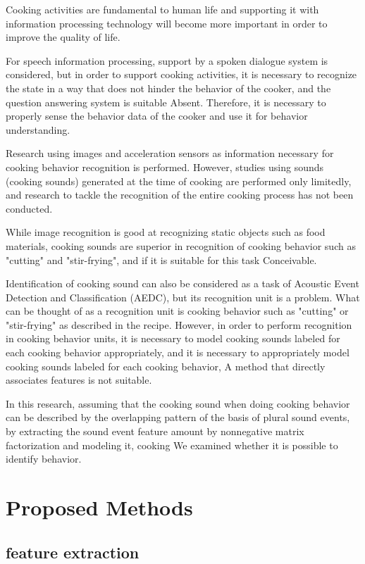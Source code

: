 \documentclass[sigchi]{acmart}
\begin{document}
Cooking activities are fundamental to human life and supporting it with information processing technology will become more important in order to improve the quality of life\cite{Uriu2012}.

For speech information processing, support by a spoken dialogue system is considered, but in order to support cooking activities, it is necessary to recognize the state in a way that does not hinder the behavior of the cooker, and the question answering system is suitable Absent. Therefore, it is necessary to properly sense the behavior data of the cooker and use it for behavior understanding.

Research using images and acceleration sensors as information necessary for cooking behavior recognition is performed\cite{Torre2008}\cite{Shimada2013}\cite{Kuehne2014}.
However, studies using sounds (cooking sounds) generated at the time of cooking are performed only limitedly\cite{Kojima2016}, and research to tackle the recognition of the entire cooking process has not been conducted.

While image recognition is good at recognizing static objects such as food materials, cooking sounds are superior in recognition of cooking behavior such as "cutting" and "stir-frying", and if it is suitable for this task Conceivable.

Identification of cooking sound can also be considered as a task of Acoustic Event Detection and Classification (AEDC), but its recognition unit is a problem.
What can be thought of as a recognition unit is cooking behavior such as "cutting" or "stir-frying" as described in the recipe. However, in order to perform recognition in cooking behavior units, it is necessary to model cooking sounds labeled for each cooking behavior appropriately, and it is necessary to appropriately model cooking sounds labeled for each cooking behavior, A method that directly associates features is not suitable\cite{Maijala2018}.

In this research, assuming that the cooking sound when doing cooking behavior can be described by the overlapping pattern of the basis of plural sound events, by extracting the sound event feature amount by nonnegative matrix factorization and modeling it, cooking We examined whether it is possible to identify behavior.

\section{Proposed Methods}
\subsection{feature extraction}
\end{document}
